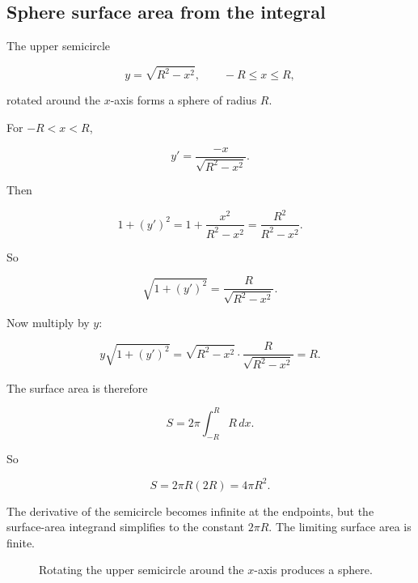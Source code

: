 \subsection{Sphere surface area from the integral}
\label{subsec:sphere-surface-area-integral}

The upper semicircle

\[
y=\sqrt{R^2-x^2},
\qquad -R\le x\le R,
\]

rotated around the \(x\)-axis forms a sphere of radius \(R\).

For \(-R<x<R\),

\[
y'=\frac{-x}{\sqrt{R^2-x^2}}.
\]

Then

\[
1+(y')^2
=
1+\frac{x^2}{R^2-x^2}
=
\frac{R^2}{R^2-x^2}.
\]

So

\[
\sqrt{1+(y')^2}
=
\frac{R}{\sqrt{R^2-x^2}}.
\]

Now multiply by \(y\):

\[
y\sqrt{1+(y')^2}
=
\sqrt{R^2-x^2}\cdot
\frac{R}{\sqrt{R^2-x^2}}
=
R.
\]

The surface area is therefore

\[
S
=
2\pi\int_{-R}^{R} R\,dx.
\]

So

\[
S
=
2\pi R(2R)
=
\boxed{4\pi R^2}.
\]

The derivative of the semicircle becomes infinite at the endpoints, but the surface-area
integrand simplifies to the constant \(2\pi R\).  The limiting surface area is finite.

\begin{figure}[h]
\centering
{}
\caption{Rotating the upper semicircle around the \(x\)-axis produces a sphere.}
\label{fig:sphere-from-semicircle}
\end{figure}

